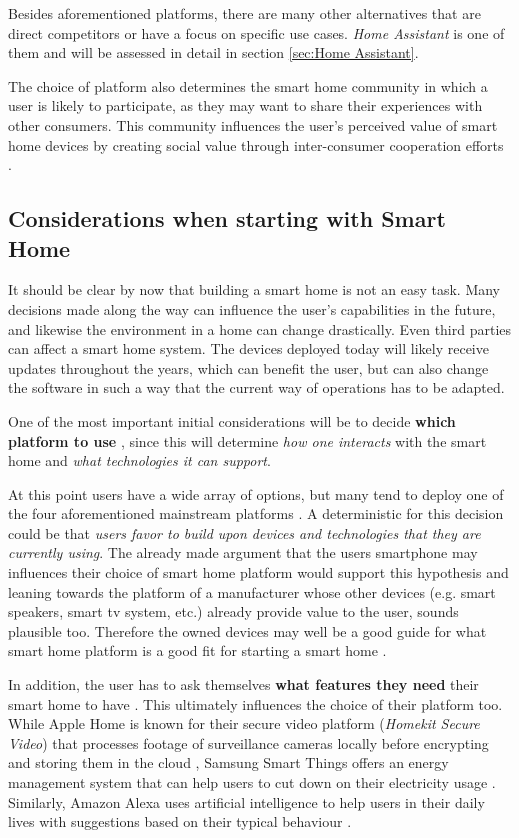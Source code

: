 Besides aforementioned platforms, there are many other alternatives that are direct competitors or have a focus on specific use cases. \textit{Home Assistant} is one of them and will be assessed in detail in section \ref{sec:Home Assistant}.

The choice of platform also determines the smart home community in which a user is likely to participate, as they may want to share their experiences with other consumers. This community influences the user's perceived value of smart home devices by creating social value through inter-consumer cooperation efforts \cite{TangRuiyang2021SoPE}.


\subsection{Considerations when starting with Smart Home}
It should be clear by now that building a smart home is not an easy task. Many decisions made along the way can influence the user's capabilities in the future, and likewise the environment in a home can change drastically. Even third parties can affect a smart home system. The devices deployed today will likely receive updates throughout the years, which can benefit the user, but can also change the software in such a way that the current way of operations has to be adapted.

One of the most important initial considerations will be to decide \textbf{which platform to use} \cite{Tuohy2023SHP}, since this will determine \textit{how one interacts} with the smart home and \textit{what technologies it can support}.

At this point users have a wide array of options, but many tend to deploy one of the four aforementioned mainstream platforms \cite{Tuohy2023SHP}. A deterministic for this decision could be that \textit{users favor to build upon devices and technologies that they are currently using}. The already made argument that the users smartphone may influences their choice of smart home platform would support this hypothesis and leaning towards the platform of a manufacturer whose other devices (e.g. smart speakers, smart tv system, etc.) already provide value to the user, sounds plausible too. Therefore the owned devices may well be a good guide for what smart home platform is a good fit for starting a smart home \cite{Tuohy2023SHP}.

In addition, the user has to ask themselves \textbf{what features they need} their smart home to have \cite{Tuohy2023SHP}. This ultimately influences the choice of their platform too. While Apple Home is known for their secure video platform (\textit{Homekit Secure Video}) that processes footage of surveillance cameras locally before encrypting and storing them in the cloud \cite{Kastrenakes2019HKSC}, Samsung Smart Things offers an energy management system that can help users to cut down on their electricity usage \cite{Tuohy2023SHP}\cite{SamsungSmartThingsEnergy}. Similarly, Amazon Alexa uses artificial intelligence to help users in their daily lives with suggestions based on their typical behaviour \cite{Liao2018AH}.

